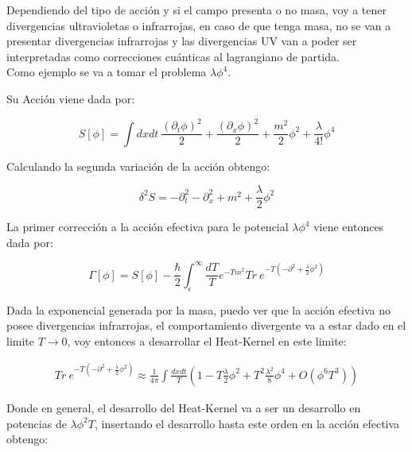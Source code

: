 Dependiendo del tipo de acción y si el campo presenta o no masa, voy a tener divergencias ultravioletas o infrarrojas, en caso de que tenga masa, no se van a presentar divergencias infrarrojas y las divergencias UV van a poder ser interpretadas como correcciones cuánticas al lagrangiano de partida. \\


Como ejemplo se va a tomar el problema $\lambda \phi ^4 $.

Su Acción viene dada por:

\begin{equation}
S[ \phi ] = \int dx dt \ 
\frac{( \partial _t \phi ) ^2}{2} +  
\frac{( \partial _x \phi ) ^2}{2} +
\frac{m ^2 }{2} \phi ^2 +
\frac{\lambda}{4!} \phi ^4 
\end{equation}

Calculando la segunda variación de la acción obtengo:

\begin{equation}
\delta ^2 S = 
- \partial _t ^2 
- \partial _x ^2 
+ m ^2 
+ \frac{\lambda}{2}\phi ^2 
\end{equation}

La primer corrección a la acción efectiva para le potencial $\lambda \phi ^4 $ viene entonces dada por:

\begin{equation}
\Gamma [ \phi ] = 
S[ \phi ] - 
\frac{\hbar }{2}
\int _ { \epsilon } ^{\infty} \frac{ dT}{T} 
e ^{- T m ^2 }
Tr \  e ^{- T ( - \partial ^2 + \frac{\lambda}{2} \phi ^2 ) }
\end{equation}

Dada la exponencial generada por la masa, puedo ver que la acción efectiva no posee divergencias infrarrojas, el comportamiento divergente va a estar dado en el limite $T \rightarrow 0$, voy entonces a desarrollar el Heat-Kernel en este limite:



\begin{equation}
\begin{array}{c}
Tr \  e ^{- T ( - \partial ^2 + \frac{\lambda}{2} \phi ^2 ) } \approx
\frac{1}{4 \pi}
\int
\frac{  dx dt }{T}
\left(
1  -
T  \frac{\lambda}{2} \phi ^2  +
T ^2 \frac{\lambda ^2 }{8} \phi ^4 + O ( \phi ^6 T ^3)
\right)

\end{array}
\end{equation}

Donde en general, el desarrollo del Heat-Kernel va a ser un desarrollo en potencias de $ \lambda \phi ^2 T $, insertando el desarrollo hasta este orden en la acción efectiva obtengo:

